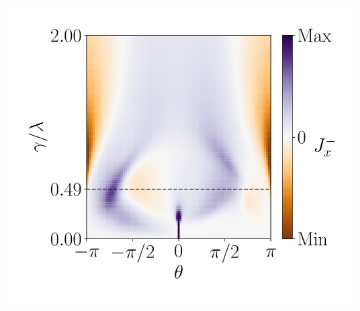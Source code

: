 \begin{figure}[h!]
\begin{minipage}[h!]{1\textwidth}
\begin{subfigure}[b!]{0.35 \textwidth}
             \label{}
         \end{subfigure}\hspace*{-0.5em}
         \begin{subfigure}[b!]{0.35 \textwidth}
             \caption{}
             \includegraphics[width=\textwidth]{Imagenes/Resultados_pump_Fractal/y/current_square_pump_negy.pdf}
             \label{}
         \end{subfigure}\hspace*{-0.5em}
     \end{minipage}\vspace*{-1em}
     

\end{figure}

